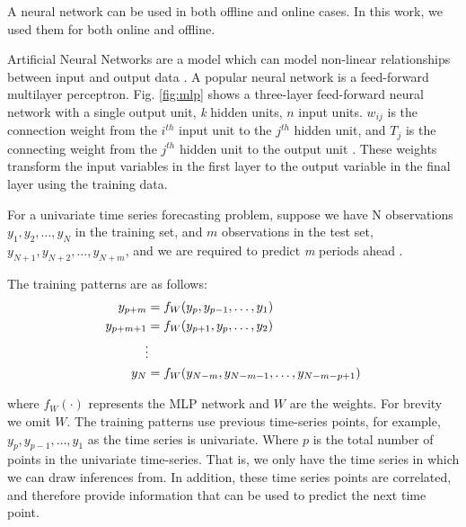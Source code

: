 A neural network can be used in both offline and online cases. In this work, we used them for both online and offline.

Artificial Neural Networks are a model which can model non-linear relationships between input and output data \cite{Akaike1974}. A popular neural network is a feed-forward multilayer perceptron. Fig. \ref{fig:mlp} shows a three-layer feed-forward neural network with a single output unit, \textit{k} hidden units, $n$ input units. $w_{ij}$ is the connection weight from the $i^{th}$ input unit to the $j^{th}$ hidden unit,  and $T_j$ is the connecting weight from the $j^{th}$ hidden unit to the output unit \cite{Pao2007}. These weights transform the input variables in the first layer to the output variable in the final layer using the training data. 


For a univariate time series forecasting problem, suppose we have N observations $y_1, y_2, \ldots, y_N$ in the training set, and $m$ observations in the test set, $y_{N+1}, y_{N+2}, \ldots, y_{N+m}$, and we are required to predict \textit{m} periods ahead \cite{Pao2007}. 

The training patterns are as follows:
\begin{align}
y_{p+m} & =f_{W}(y_p, y_{p-1},\ldots,y_1)\\
y_{p+m+1} & =f_{W}(y_{p+1}, y_{p},\ldots,y_2)\\
&\vdotswithin  \notag \\
y_{N} & =f_{W}(y_{N-m},y_{N-m-1},\ldots,y_{N-m-p+1})
\end{align}

\noindent where $f_{W}(\cdot)$ represents the MLP network and $W$ are the weights. For brevity we omit $W$. The training patterns use previous time-series points, for example, $y_p, y_{p-1},\ldots,y_1$ as the time series is univariate. Where $p$ is the total number of points in the univariate time-series. That is, we only have the time series in which we can draw inferences from. In addition, these time series points are correlated, and therefore provide information that can be used to predict the next time point.

